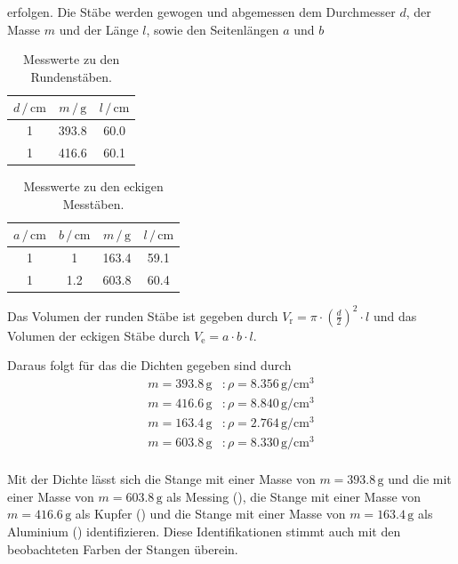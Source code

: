 \noindent
erfolgen. Die Stäbe werden gewogen und abgemessen dem Durchmesser $d$, der Masse $m$ und der Länge $l$, sowie den Seitenlängen $a$ und $b$

\begin{table}
	\centering
	\caption{Messwerte zu den Rundenstäben.} 
	\label{tab:vana} 
	\begin{tabular}{c c c}
	\toprule
	$d \, / \, \si{\centi\meter}$ & $m \, / \, \si{\gram} $ & $l \, / \, \si{\centi\meter}$\\
	\midrule
    1   &   393.8   &   60.0 \\
    1   &   416.6   &   60.1 \\
\bottomrule
	\end{tabular}
\end{table}

\begin{table}
	\centering
	\caption{Messwerte zu den eckigen Messtäben.} 
	\label{tab:vana} 
	\begin{tabular}{c c c c}
	\toprule
	$a \, / \, \si{\centi\meter}$ & $b \, / \, \si{\centi\meter}$ & $m \, / \, \si{\gram} $ & $l \, / \, \si{\centi\meter}$\\
	\midrule
    1   &   1   &   163.4   &   59.1 \\
    1   &   1.2   &  603.8  &   60.4 \\
\bottomrule
	\end{tabular}
\end{table}

\noindent
Das Volumen der runden Stäbe ist gegeben durch $V_\text{r} = \pi \cdot \left( \frac{d}{2} \right)^2 \cdot l$ und das Volumen der eckigen Stäbe durch 
$V_\text{e} = a \cdot b \cdot l$.

\noindent
Daraus folgt für das die Dichten gegeben sind durch
\begin{align*}
    m = 393.8 \, \si{\gram} &: \rho = 8.356\, \si{\gram\per\centi\meter\tothe{3}}\\
    m = 416.6 \, \si{\gram} &: \rho = 8.840\, \si{\gram\per\centi\meter\tothe{3}}\\
    m = 163.4 \, \si{\gram} &: \rho = 2.764\, \si{\gram\per\centi\meter\tothe{3}}\\
    m = 603.8 \, \si{\gram} &: \rho = 8.330\, \si{\gram\per\centi\meter\tothe{3}}\\
\end{align*}    

\noindent
Mit der Dichte lässt sich die Stange mit einer Masse von $m = 393.8 \, \si{\gram}$ und die mit einer Masse von $m = 603.8 \, \si{\gram}$ als Messing (\cite{Messing}), 
die Stange mit einer Masse von $m = 416.6 \, \si{\gram}$ als Kupfer (\cite{Kupfer}) und
die Stange mit einer Masse von $m = 163.4 \, \si{\gram}$ als Aluminium (\cite{Aluminium}) identifizieren. Diese Identifikationen stimmt auch mit den beobachteten Farben
der Stangen überein.

